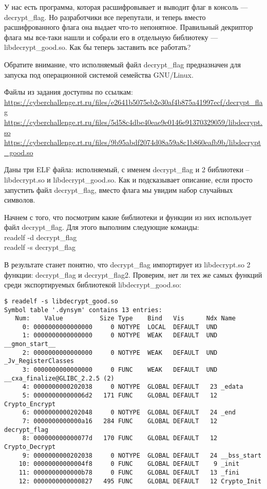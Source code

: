 
У нас есть программа, которая расшифровывает и выводит флаг в консоль — decrypt\_flag. Но разработчики все перепутали, и теперь вместо расшифрованного флага она выдает что-то непонятное. Правильный декриптор флага мы все-таки нашли и собрали его в отдельную библиотеку — libdecrypt\_good.so. Как бы теперь заставить все работать?

Обратите внимание, что исполняемый файл decrypt\_flag предназначен для запуска под операционной системой семейства GNU/Linux.

Файлы из задания доступны по ссылкам:\\
\url{https://cyberchallenge.rt.ru/files/e2641b5075eb2e30af4b875a41997ecf/decrypt_flag}\\
\url{https://cyberchallenge.rt.ru/files/5d58c4dbe40eae9e0146e91370329059/libdecrypt.so}\\
\url{https://cyberchallenge.rt.ru/files/9b95abdf2074d08a59a8c1b860eafb9b/libdecrypt_good.so}

\solutionSection

Даны три ELF файла: исполняемый, с именем decrypt\_flag и 2 библиотеки – libdecrypt.so и libdecrypt\_good.so. Как и подсказывает описание, если просто запустить файл decrypt\_flag, вместо флага мы увидим набор случайных символов.

Начнем с того, что посмотрим какие библиотеки и функции из них использует файл decrypt\_flag. Для этого выполним следующие команды:\\
readelf -d decrypt\_flag\\
readelf -s decrypt\_flag

В результате станет понятно, что decrypt\_flag импортирует из libdecrypt.so 2 функции: decrypt\_flag и decrypt\_flag2. Проверим, нет ли тех же самых функций среди экспортируемых библиотекой libdecrypt\_good.so:\\
\begin{verbatim}
$ readelf -s libdecrypt_good.so
Symbol table '.dynsym' contains 13 entries:
   Num:    Value          Size Type    Bind   Vis      Ndx Name
     0: 0000000000000000     0 NOTYPE  LOCAL  DEFAULT  UND
     1: 0000000000000000     0 NOTYPE  WEAK   DEFAULT  UND __gmon_start__
     2: 0000000000000000     0 NOTYPE  WEAK   DEFAULT  UND _Jv_RegisterClasses
     3: 0000000000000000     0 FUNC    WEAK   DEFAULT  UND __cxa_finalize@GLIBC_2.2.5 (2)
     4: 0000000000202038     0 NOTYPE  GLOBAL DEFAULT   23 _edata
     5: 00000000000006d2   171 FUNC    GLOBAL DEFAULT   12 Crypto_Encrypt
     6: 0000000000202048     0 NOTYPE  GLOBAL DEFAULT   24 _end
     7: 0000000000000a16   284 FUNC    GLOBAL DEFAULT   12 decrypt_flag
     8: 000000000000077d   170 FUNC    GLOBAL DEFAULT   12 Crypto_Decrypt
     9: 0000000000202038     0 NOTYPE  GLOBAL DEFAULT   24 __bss_start
    10: 00000000000004f8     0 FUNC    GLOBAL DEFAULT    9 _init
    11: 0000000000000b78     0 FUNC    GLOBAL DEFAULT   13 _fini
    12: 0000000000000827   495 FUNC    GLOBAL DEFAULT   12 Crypto_Init
\end{verbatim}


